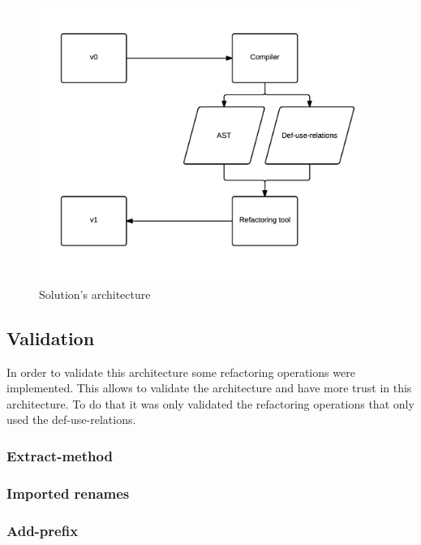 \begin{figure}[htbp]
	\centering
	\includegraphics[width=0.95\textwidth]{img/arquitectura.png}
	\caption{Solution's architecture}
	\label{fig:architecture}
\end{figure}

\subsection{Validation}
In order to validate this architecture some refactoring operations were implemented. 
This allows to validate the architecture and have more trust in this architecture.
To do that it was only validated the refactoring operations that only used the def-use-relations.

\subsubsection{Extract-method}
\subsubsection{Imported renames}
\subsubsection{Add-prefix}

